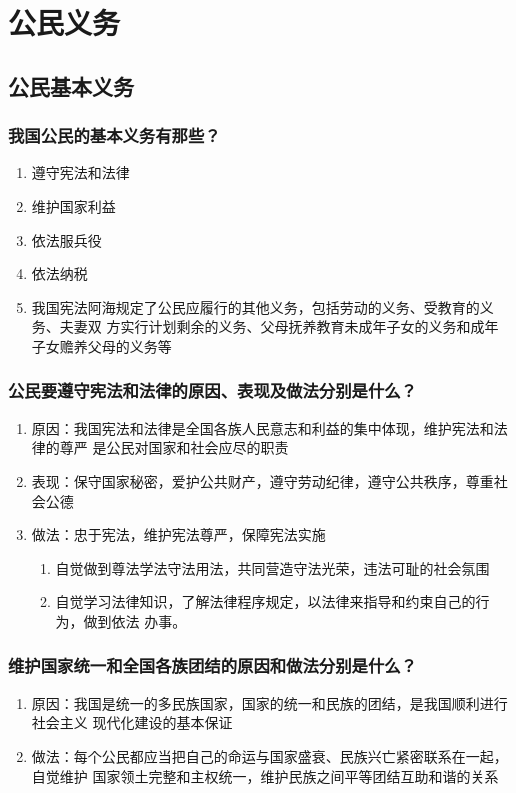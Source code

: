 \documentclass[11pt]{article}
\begin{document}
\section{公民义务}
\label{sec:org460fb68}
\subsection{公民基本义务}
\label{sec:org5c98240}
\subsubsection{我国公民的基本义务有那些？}
\label{sec:org7be7cd0}
\begin{enumerate}
\item 遵守宪法和法律
\item 维护国家利益
\item 依法服兵役
\item 依法纳税
\item 我国宪法阿海规定了公民应履行的其他义务，包括劳动的义务、受教育的义务、夫妻双
方实行计划剩余的义务、父母抚养教育未成年子女的义务和成年子女赡养父母的义务等
\end{enumerate}
\subsubsection{公民要遵守宪法和法律的原因、表现及做法分别是什么？}
\label{sec:orgfb2976a}
\begin{enumerate}
\item 原因：我国宪法和法律是全国各族人民意志和利益的集中体现，维护宪法和法律的尊严
是公民对国家和社会应尽的职责
\item 表现：保守国家秘密，爱护公共财产，遵守劳动纪律，遵守公共秩序，尊重社会公德
\item 做法：忠于宪法，维护宪法尊严，保障宪法实施
\begin{enumerate}
\item 自觉做到尊法学法守法用法，共同营造守法光荣，违法可耻的社会氛围
\item 自觉学习法律知识，了解法律程序规定，以法律来指导和约束自己的行为，做到依法
办事。
\end{enumerate}
\end{enumerate}
\subsubsection{维护国家统一和全国各族团结的原因和做法分别是什么？}
\label{sec:org64e1eae}
\begin{enumerate}
\item 原因：我国是统一的多民族国家，国家的统一和民族的团结，是我国顺利进行社会主义
现代化建设的基本保证
\item 做法：每个公民都应当把自己的命运与国家盛衰、民族兴亡紧密联系在一起，自觉维护
国家领土完整和主权统一，维护民族之间平等团结互助和谐的关系
\end{enumerate}
\end{document}
